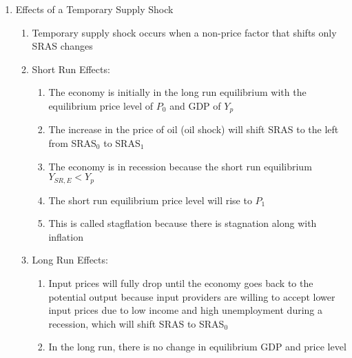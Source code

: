 \documentclass[12pt]{article}
\begin{document}
\begin{enumerate}
\begin{enumerate}
        \end{enumerate}

      \item Effects of a Temporary Supply Shock

        \begin{enumerate}

          \item Temporary supply shock occurs when a non-price factor that shifts only SRAS changes

          \item Short Run Effects:

            \begin{enumerate}

              \item The economy is initially in the long run equilibrium with the equilibrium price level of $P_0$ and GDP of $Y_p$

              \item The increase in the price of oil (oil shock) will shift SRAS to the left from SRAS$_0$ to SRAS$_1$

              \item The economy is in recession because the short run equilibrium $Y_{SR,E}<Y_p$

              \item The short run equilibrium price level will rise to $P_1$

              \item This is called stagflation because there is stagnation along with inflation

            \end{enumerate}

          \item Long Run Effects:

            \begin{enumerate}

              \item Input prices will fully drop until the economy goes back to the potential output because input providers are willing to accept lower input prices due to low income and high unemployment during a recession, which will shift SRAS to SRAS$_0$

              \item In the long run, there is no change in equilibrium GDP and price level

            \end{enumerate}


\end{enumerate}
\end{enumerate}
\end{document}
